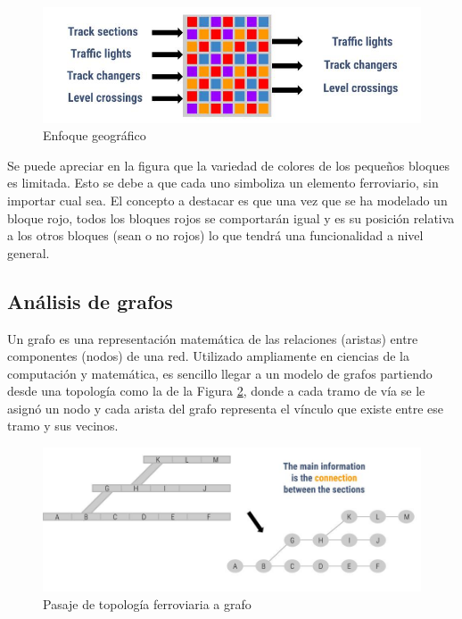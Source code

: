 		\begin{figure}[h]
		\centering
			\includegraphics[scale=.55]{./Figures/Geografico}
			\caption{Enfoque geográfico}
			\label{fig:Enfoque_Geografico}
		\end{figure}

	Se puede apreciar en la figura que la variedad de colores de los pequeños bloques es limitada. Esto se debe a que cada uno simboliza un elemento ferroviario, sin importar cual sea. El concepto a destacar es que una vez que se ha modelado un bloque rojo, todos los bloques rojos se comportarán igual y es su posición relativa a los otros bloques (sean o no rojos) lo que tendrá una funcionalidad a nivel general.
	
	\subsection{Análisis de grafos}
		
		Un grafo es una representación matemática de las relaciones (aristas) entre componentes (nodos) de una red. Utilizado ampliamente en ciencias de la computación y matemática, es sencillo llegar a un modelo de grafos partiendo desde una topología como la de la Figura \ref{fig:Topologia_Grafo}, donde a cada tramo de vía se le asignó un nodo y cada arista del grafo representa el vínculo que existe entre ese tramo y sus vecinos.
		
		\begin{figure}[h]
		\centering
			\includegraphics[scale=.4]{./Figures/Topologia_grafo}
			\caption{Pasaje de topología ferroviaria a grafo}
			\label{fig:Topologia_Grafo}
		\end{figure}
	
